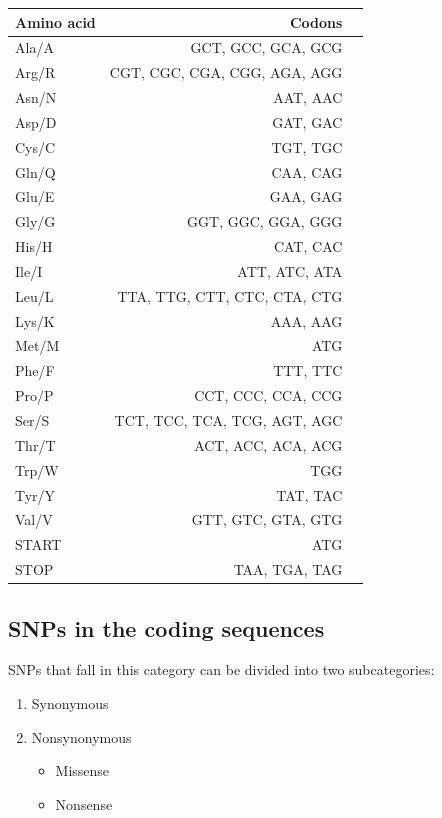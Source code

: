 \begin{tabular}{|l|rl|}
\hline
Amino acid          &		 Codons        &       \\
\hline
Ala/A 		&	GCT, GCC, GCA, GCG       &      	\\
Arg/R 		&	CGT, CGC, CGA, CGG, AGA, AGG       &      		\\
Asn/N	 	&	AAT, AAC       &      	\\
Asp/D		&	GAT, GAC       &      	\\
Cys/C		&	TGT, TGC       &      	\\
Gln/Q		&	CAA, CAG       &      	\\
Glu/E		&	GAA, GAG       &      	\\
Gly/G		&	GGT, GGC, GGA, GGG       &      	\\
His/H		&	CAT, CAC       &      	\\
Ile/I		&	ATT, ATC, ATA       &      	\\
Leu/L		&	TTA, TTG, CTT, CTC, CTA, CTG       &      	\\
Lys/K		&	AAA, AAG       &      	\\
Met/M		&	ATG       &      	\\
Phe/F		&	TTT, TTC       &      	\\
Pro/P		&	CCT, CCC, CCA, CCG       &      	\\
Ser/S		&	TCT, TCC, TCA, TCG, AGT, AGC       &      	\\
Thr/T		&	ACT, ACC, ACA, ACG       &      	\\
Trp/W		&	TGG       &      	\\
Tyr/Y		&	TAT, TAC       &      	\\
Val/V		&	GTT, GTC, GTA, GTG       &      	\\
START		&	ATG       &      	\\
STOP		&	TAA, TGA, TAG       &      	\\
\hline
\end{tabular}

\newpage

\subsection{SNPs in the coding sequences}
SNPs that fall in this category can be divided into two subcategories:

\begin{enumerate}
	\item Synonymous
	\item Nonsynonymous
	\begin{itemize}
	\item Missense
	\item Nonsense
	\end{itemize}
	\end{enumerate}

